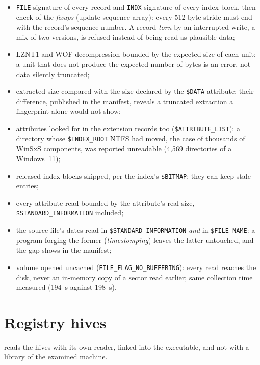 \documentclass[11pt,a4paper,oneside]{report}
\begin{document}
\begin{itemize}
  \item \texttt{FILE} signature of every  record and
    \texttt{INDX} signature of every index block, then check of the
    \emph{fixups} (update sequence array): every 512-byte stride must end with
    the record's sequence number. A record \emph{torn} by an interrupted write,
    a mix of two versions, is refused instead of being read as plausible
    data;
  \item LZNT1 and WOF decompression bounded by the expected size of each unit:
    a unit that does not produce the expected number of bytes is an error, not
    data silently truncated;
  \item extracted size compared with the size declared by the \texttt{\$DATA}
    attribute: their difference, published in the manifest, reveals a
    truncated extraction a fingerprint alone would not show;
  \item attributes looked for in the extension records too
    (\texttt{\$ATTRIBUTE\_LIST}): a directory whose \texttt{\$INDEX\_ROOT}
    NTFS had moved, the case of thousands of WinSxS components, was reported
    unreadable (4,569 directories of a Windows~11);
  \item released index blocks skipped, per the index's \texttt{\$BITMAP}:
    they can keep stale entries;
  \item every attribute read bounded by the attribute's real size,
    \texttt{\$STANDARD\_INFORMATION} included;
  \item the source file's dates read in \texttt{\$STANDARD\_INFORMATION}
    \emph{and} in \texttt{\$FILE\_NAME}: a program forging the former
    (\emph{timestomping}) leaves the latter untouched, and the gap shows in the
    manifest;
  \item volume opened uncached (\texttt{FILE\_FLAG\_NO\_BUFFERING}): every
    read reaches the disk, never an in-memory copy of a sector read earlier;
    same collection time measured (194~s against 198~s).
\end{itemize}

\section{Registry hives}

\wac{} reads the hives with its own reader, linked into the executable, and not
with a library of the examined machine.
\end{document}
